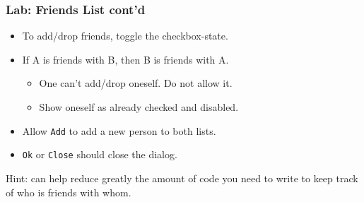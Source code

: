 \begin{slide}
\frametitle{Lab: Friends List cont'd}
\begin{itemize}
\item  To add/drop friends, toggle the checkbox-state.
\item  If A is friends with B, then B is friends with A.
\begin{itemize}
\item  One can't add/drop oneself. Do not allow it. 
\item Show oneself as already checked and disabled.
\end{itemize}
\item  Allow \texttt{Add} to add a new person to both lists.
\item  \texttt{Ok} or \texttt{Close} should close the dialog. 
\end{itemize}
Hint:  can help reduce greatly the amount of code you need to write to keep track of who is friends with whom.
\end{slide}
